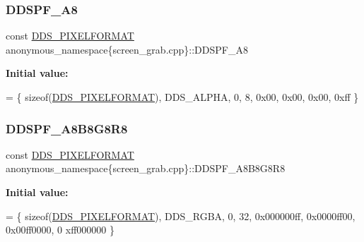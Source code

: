 \subsubsection{\texorpdfstring{D\+D\+S\+P\+F\+\_\+\+A8}{DDSPF\_A8}}
{\footnotesize\ttfamily const \mbox{\hyperlink{structanonymous__namespace_02screen__grab_8cpp_03_1_1_d_d_s___p_i_x_e_l_f_o_r_m_a_t}{D\+D\+S\+\_\+\+P\+I\+X\+E\+L\+F\+O\+R\+M\+AT}} anonymous\+\_\+namespace\{screen\+\_\+grab.\+cpp\}\+::D\+D\+S\+P\+F\+\_\+\+A8}

{\bfseries Initial value\+:}
\begin{DoxyCode}
=
        \{ \textcolor{keyword}{sizeof}(\mbox{\hyperlink{struct_d_d_s___p_i_x_e_l_f_o_r_m_a_t}{DDS\_PIXELFORMAT}}), DDS\_ALPHA, 0, 8, 0x00, 0x00, 0x00, 0xff \}
\end{DoxyCode}
\mbox{\label{namespaceanonymous__namespace_02screen__grab_8cpp_03_ab522707bc1a8d11512820994fe48bf84}} 
\subsubsection{\texorpdfstring{D\+D\+S\+P\+F\+\_\+\+A8\+B8\+G8\+R8}{DDSPF\_A8B8G8R8}}
{\footnotesize\ttfamily const \mbox{\hyperlink{structanonymous__namespace_02screen__grab_8cpp_03_1_1_d_d_s___p_i_x_e_l_f_o_r_m_a_t}{D\+D\+S\+\_\+\+P\+I\+X\+E\+L\+F\+O\+R\+M\+AT}} anonymous\+\_\+namespace\{screen\+\_\+grab.\+cpp\}\+::D\+D\+S\+P\+F\+\_\+\+A8\+B8\+G8\+R8}

{\bfseries Initial value\+:}
\begin{DoxyCode}
=
        \{ \textcolor{keyword}{sizeof}(\mbox{\hyperlink{struct_d_d_s___p_i_x_e_l_f_o_r_m_a_t}{DDS\_PIXELFORMAT}}), DDS\_RGBA, 0, 32, 0x000000ff, 0x0000ff00, 0x00ff0000, 0
      xff000000 \}
\end{DoxyCode}
\mbox{\label{namespaceanonymous__namespace_02screen__grab_8cpp_03_af61f6aa4071ff450b98e4936378eaac6}} 
